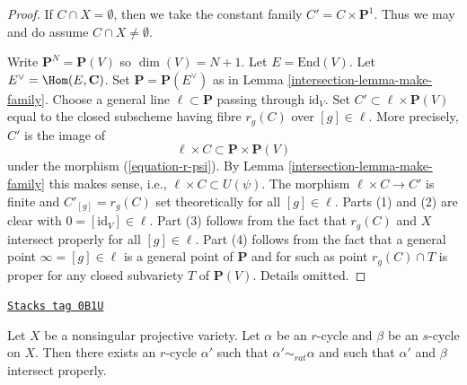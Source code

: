 \begin{proof}

If $C \cap X = \emptyset$, then we take the constant family
$C' = C \times \mathbf{P}^1$. Thus we may and do assume
$C \cap X \not = \emptyset$.

\medskip\noindent
Write $\mathbf{P}^N = \mathbf{P}(V)$ so $\dim(V) = N + 1$. Let
$E = \text{End}(V)$. Let $E^\vee = \Hom(E, \mathbf{C})$. Set
$\mathbf{P} = \mathbf{P}(E^\vee)$ as in Lemma \ref{intersection-lemma-make-family}.
Choose a general line $\ell \subset \mathbf{P}$ passing through $\text{id}_V$.
Set $C' \subset \ell \times \mathbf{P}(V)$ equal to the
closed subscheme having fibre $r_g(C)$ over $[g] \in \ell$.
More precisely, $C'$ is the image of
$$
\ell \times C \subset \mathbf{P} \times \mathbf{P}(V)
$$
under the morphism (\ref{equation-r-psi}). By Lemma \ref{intersection-lemma-make-family}
this makes sense, i.e., $\ell \times C \subset U(\psi)$. The morphism
$\ell \times C \to C'$ is finite and $C'_{[g]} = r_g(C)$ set theoretically
for all $[g] \in \ell$. Parts (1) and (2) are clear with
$0 = [\text{id}_V] \in \ell$. Part (3) follows from the fact
that $r_g(C)$ and $X$ intersect properly for all $[g] \in \ell$.
Part (4) follows from the fact that a general point $\infty = [g] \in \ell$
is a general point of $\mathbf{P}$ and for such as point
$r_g(C) \cap T$ is proper for any closed subvariety $T$ of $\mathbf{P}(V)$.
Details omitted.
\end{proof}

\begin{lemma}
\label{intersection-lemma-moving-move}
\href{https://stacks.math.columbia.edu/tag/0B1U}{\texttt{Stacks tag 0B1U}}

Let $X$ be a nonsingular projective variety. Let $\alpha$ be an
$r$-cycle and $\beta$ be an $s$-cycle on $X$. Then there exists
an $r$-cycle $\alpha'$ such that $\alpha' \sim_{rat} \alpha$ and
such that $\alpha'$ and $\beta$ intersect properly.
\end{lemma}

